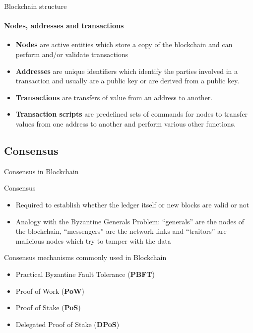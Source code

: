 \documentclass{beamer}
\begin{document}
  \begin{frame}{Blockchain structure}
    \framesubtitle{Nodes, addresses and transactions}
    \begin{itemize}
      \item \textbf{Nodes} are active entities which store a copy of the blockchain and can
      perform and/or validate transactions \pause
      \item \textbf{Addresses} are unique identifiers which identify the parties involved in a
      transaction and usually are a public key or are derived from a public key. \pause
      \item \textbf{Transactions} are transfers of value from an address to another. \pause
      \item \textbf{Transaction scripts} are predefined sets of commands for nodes to transfer
      values from one address to another and perform various other functions.
    \end{itemize}
  \end{frame}



  \subsection{Consensus}
  \begin{frame}{Consensus in Blockchain}
    \begin{block}{Consensus}
      \begin{itemize}
        \item Required to establish whether the ledger itself or new blocks are
        valid or not
        \item Analogy with the Byzantine Generals Problem: ``generals'' are the nodes
        of the blockchain, ``messengers'' are the network links and ``traitors''
        are malicious nodes which try to tamper with the data
      \end{itemize}
    \end{block}
    \pause

    \begin{block}{Consensus mechanisms commonly used in Blockchain}
      \begin{itemize}
        \item Practical Byzantine Fault Tolerance (\textbf{PBFT})
        \item Proof of Work (\textbf{PoW})
        \item Proof of Stake (\textbf{PoS})
        \item Delegated Proof of Stake (\textbf{DPoS})
      \end{itemize}
    \end{block}
  \end{frame}
\end{document}
